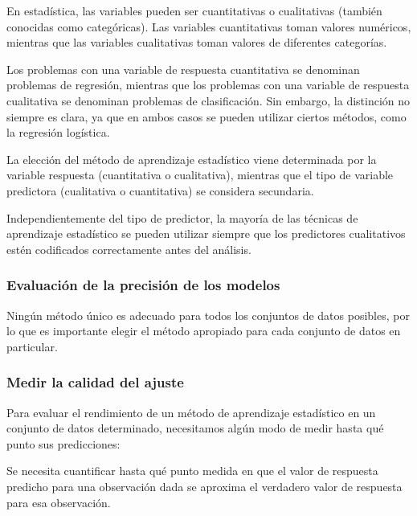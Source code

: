 \documentclass[
  letterpaper,
  DIV=11,
  numbers=noendperiod]{scrartcl}
\begin{document}
En estadística, las variables pueden ser cuantitativas o cualitativas
(también conocidas como categóricas). Las variables cuantitativas toman
valores numéricos, mientras que las variables cualitativas toman valores
de diferentes categorías.

Los problemas con una variable de respuesta cuantitativa se denominan
problemas de regresión, mientras que los problemas con una variable de
respuesta cualitativa se denominan problemas de clasificación. Sin
embargo, la distinción no siempre es clara, ya que en ambos casos se
pueden utilizar ciertos métodos, como la regresión logística.

La elección del método de aprendizaje estadístico viene determinada por
la variable respuesta (cuantitativa o cualitativa), mientras que el tipo
de variable predictora (cualitativa o cuantitativa) se considera
secundaria.

Independientemente del tipo de predictor, la mayoría de las técnicas de
aprendizaje estadístico se pueden utilizar siempre que los predictores
cualitativos estén codificados correctamente antes del análisis.

\hypertarget{evaluaciuxf3n-de-la-precisiuxf3n-de-los-modelos}{%
\subsubsection{\texorpdfstring{\textbf{Evaluación de la precisión de los
modelos}}{Evaluación de la precisión de los modelos}}\label{evaluaciuxf3n-de-la-precisiuxf3n-de-los-modelos}}

Ningún método único es adecuado para todos los conjuntos de datos
posibles, por lo que es importante elegir el método apropiado para cada
conjunto de datos en particular.

\hypertarget{medir-la-calidad-del-ajuste}{%
\subsubsection{\texorpdfstring{\textbf{Medir la calidad del
ajuste}}{Medir la calidad del ajuste}}\label{medir-la-calidad-del-ajuste}}

Para evaluar el rendimiento de un método de aprendizaje estadístico en
un conjunto de datos determinado, necesitamos algún modo de medir hasta
qué punto sus predicciones:

Se necesita cuantificar hasta qué punto medida en que el valor de
respuesta predicho para una observación dada se aproxima el verdadero
valor de respuesta para esa observación.
\end{document}
